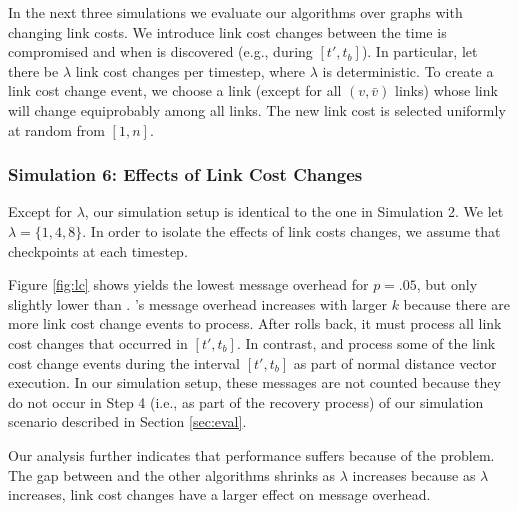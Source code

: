 In the next three simulations we evaluate our algorithms over graphs with changing link costs. We introduce link cost changes between the time \bad is compromised and when \bad is discovered 
(e.g., during $[t',t_b]$). 
In particular, let there be $\lambda$ link cost changes per timestep, where $\lambda$ is deterministic. 
To create a link cost change event, we choose a link (except for all $(v,\bar{v})$ links) whose link will change equiprobably among all links. 
The new link cost is selected uniformly at random from $[1,n]$. 

\subsubsection{Simulation 6: Effects of Link Cost Changes}

Except for $\lambda$, our simulation setup is identical to the one in Simulation 2. We let $\lambda = \{1,4,8\}$. In order to isolate the effects of link costs changes,
we assume that \cpr checkpoints at each timestep.

Figure \ref{fig:lc} shows \purge yields the lowest message overhead for $p=.05$, but only slightly lower than \cprs. 
\cprs's message overhead increases with larger $k$ because there are more link cost change events to process. After \cpr rolls back, it must process all link cost
changes that occurred in $[t',t_b]$. 
In contrast, \second and \purge process some of the link cost change events during the interval $[t',t_b]$ as part of normal distance vector execution. 
In our simulation setup, these messages are not counted because 
they do not occur in Step 4 (i.e., as part of the recovery process) of our simulation scenario described in Section \ref{sec:eval}.

Our analysis further indicates that \second performance suffers because of the \infinity problem. %
The gap between \second and the other algorithms shrinks as $\lambda$ increases because as $\lambda$ increases, link cost changes have a larger effect on message overhead.


